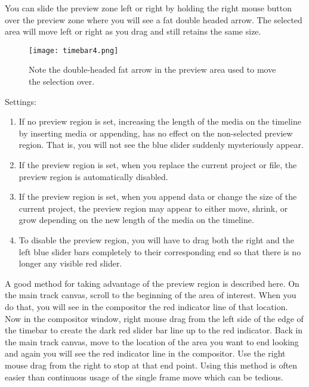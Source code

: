 You can slide the preview zone left or right by holding the right mouse button over the preview zone where you will see a fat double headed arrow.  
The selected area will move left or right as you drag and still retains the same size.

\begin{figure}[htpb]
    \centering
    \texttt{[image: timebar4.png]}
    \caption{Note the double-headed fat arrow in the preview area used  to move the selection over.}
    \label{fig:timebar4}
\end{figure}

Settings:

\begin{enumerate}
    \item  If no preview region is set, increasing the length of the media on the timeline by inserting media or
        appending, has no effect on the non-selected preview region.  That is, you will not see the blue slider
        suddenly mysteriously appear.
    \item  If the preview region is set, when you replace the current project or file,  the preview region is
        automatically disabled.
    \item  If the preview region is set, when you append data or change the size of the current project, the
        preview region may appear to either move, shrink, or grow depending on the new length of the
        media on the timeline.  
    \item  To disable the preview region, you will have to drag both the right and the left blue slider bars
        completely to their corresponding end so that there is no longer any visible red slider.
\end{enumerate}

A good method for taking advantage of the preview region is described here.  
On the main track canvas, scroll to the beginning of the area of interest.  
When you do that, you will see in the compositor the red indicator line of that location.  
Now in the compositor window, right mouse drag from the left side of the edge of the timebar to create the dark red slider bar line up to the red indicator.  
Back in the main track canvas, move to the location of the area you want to end looking and again you will see the red indicator line in the compositor.  
Use the right mouse drag from the right to stop at that end point.  Using this method is often easier than continuous usage of the single frame move which can be tedious.


